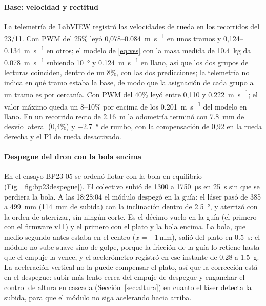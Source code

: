 \paragraph{Base: velocidad y rectitud} La telemetría de LabVIEW registró las velocidades de rueda en los recorridos del 23/11. Con PWM del 25\% leyó 0,078--\SI{0.084}{\metre\per\second} en unos tramos y 0,124--\SI{0.134}{\metre\per\second} en otros; el modelo de \eqref{eq:vss} con la masa medida de \SI{10.4}{\kilo\gram} da \SI{0.078}{\metre\per\second} subiendo \SI{10}{\degree} y \SI{0.124}{\metre\per\second} en llano, así que los dos grupos de lecturas coinciden, dentro de un 8\%, con las dos predicciones; la telemetría no indica en qué tramo estaba la base, de modo que la asignación de cada grupo a un tramo es por cercanía. Con PWM del 40\% leyó entre 0,110 y \SI{0.222}{\metre\per\second}; el valor máximo queda un 8--10\% por encima de los \SI{0.201}{\metre\per\second} del modelo en llano. En un recorrido recto de \SI{2.16}{\metre} la odometría terminó con \SI{7.8}{\milli\metre} de desvío lateral (0,4\%) y \SI{-2.7}{\degree} de rumbo, con la compensación de 0,92 en la rueda derecha y el PI de rueda desactivado.

\paragraph{Despegue del dron con la bola encima} En el ensayo BP23-05 se ordenó flotar con la bola en equilibrio (Fig.~\ref{fig:bp23despegue}). El colectivo subió de 1300 a \SI{1750}{\micro\second} en \SI{25}{\second} sin que se perdiera la bola. A las 18:28:04 el módulo despegó en la guía: el láser pasó de 385 a \SI{499}{\milli\metre} (\SI{114}{\milli\metre} de subida) con la inclinación dentro de \SI{2.5}{\degree}, y aterrizó con la orden de aterrizar, sin ningún corte. Es el décimo vuelo en la guía (el primero con el firmware v11) y el primero con el plato y la bola encima. La bola, que medio segundo antes estaba en el centro ($x=\SI{-1}{\milli\metre}$), salió del plato en \SI{0.5}{\second}: el módulo no sube suave sino de golpe, porque la fricción de la guía lo retiene hasta que el empuje la vence, y el acelerómetro registró en ese instante de 0,28 a \SI{1.5}{g}. La aceleración vertical no la puede compensar el plato, así que la corrección está en el despegue: subir más lento cerca del empuje de despegue y enganchar el control de altura en cascada (Sección~\ref{sec:altura}) en cuanto el láser detecta la subida, para que el módulo no siga acelerando hacia arriba.

